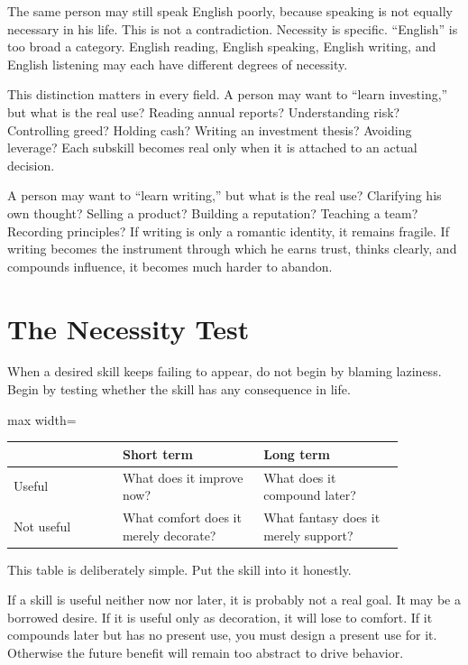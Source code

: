 The same person may still speak English poorly, because speaking is not equally necessary in his life. This is not a contradiction. Necessity is specific. ``English'' is too broad a category. English reading, English speaking, English writing, and English listening may each have different degrees of necessity.

This distinction matters in every field. A person may want to ``learn investing,'' but what is the real use? Reading annual reports? Understanding risk? Controlling greed? Holding cash? Writing an investment thesis? Avoiding leverage? Each subskill becomes real only when it is attached to an actual decision.

A person may want to ``learn writing,'' but what is the real use? Clarifying his own thought? Selling a product? Building a reputation? Teaching a team? Recording principles? If writing is only a romantic identity, it remains fragile. If writing becomes the instrument through which he earns trust, thinks clearly, and compounds influence, it becomes much harder to abandon.

\section*{The Necessity Test}

When a desired skill keeps failing to appear, do not begin by blaming laziness. Begin by testing whether the skill has any consequence in life.

\begin{center}
\begin{adjustbox}{max width=\linewidth}
\begin{tabular}{p{0.24\linewidth}p{0.31\linewidth}p{0.31\linewidth}}
\hline
 & Short term & Long term \\
\hline
Useful & What does it improve now? & What does it compound later? \\
Not useful & What comfort does it merely decorate? & What fantasy does it merely support? \\
\hline
\end{tabular}
\end{adjustbox}
\end{center}

This table is deliberately simple. Put the skill into it honestly.

If a skill is useful neither now nor later, it is probably not a real goal. It may be a borrowed desire. If it is useful only as decoration, it will lose to comfort. If it compounds later but has no present use, you must design a present use for it. Otherwise the future benefit will remain too abstract to drive behavior.

